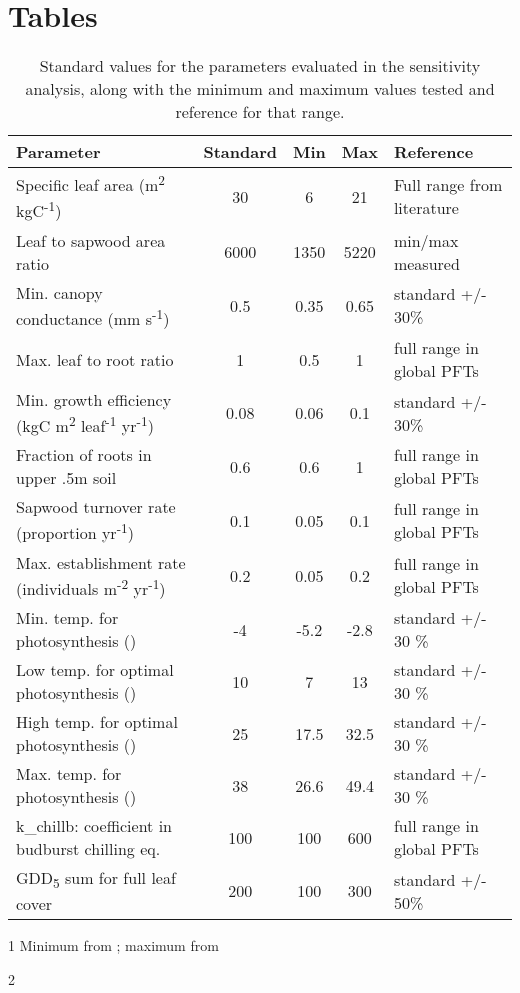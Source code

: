 \documentclass[]{article}
\title{}
\author{}
\begin{document}
	
\section{Tables}

\begin{table}[ht]
	\begin{threeparttable}
	\caption{Standard values for the parameters evaluated in the sensitivity analysis, along with the minimum and maximum values tested and reference for that range.} 
	\begin{tabular}{lcccl}
		\toprule
		Parameter & Standard & Min & Max & Reference \\ 
		\midrule
		Specific leaf area (m\textsuperscript{2} kgC\textsuperscript{-1}) & 30 & 6 & 21 & Full range from literature\tnote1 \\
		Leaf to sapwood area ratio & 6000 & 1350 & 5220 & min/max measured\tnote2 \\
		Min. canopy conductance (mm s\textsuperscript{-1}) & 0.5 & 0.35 & 0.65 & standard +/- 30\% \\
		Max. leaf to root ratio & 1 & 0.5 & 1 & full range in global PFTs \\
		Min. growth efficiency (kgC m\textsuperscript{2} leaf\textsuperscript{-1} yr\textsuperscript{-1}) & 0.08 & 0.06 & 0.1 & standard +/- 30\% \\
		Fraction of roots in upper .5m soil & 0.6 & 0.6 & 1 & full range in global PFTs \\
		Sapwood turnover rate (proportion yr\textsuperscript{-1}) & 0.1 & 0.05 & 0.1 & full range in global PFTs \\
		Max. establishment rate (individuals m\textsuperscript{-2} yr\textsuperscript{-1}) & 0.2 & 0.05 & 0.2 & full range in global PFTs \\
		Min. temp. for photosynthesis (\celsius) & -4 & -5.2 & -2.8 & standard +/- 30 \% \\
		Low temp. for optimal photosynthesis (\celsius) & 10 & 7 & 13 & standard +/- 30 \% \\
		High temp. for optimal photosynthesis (\celsius) & 25 & 17.5 & 32.5 & standard +/- 30 \% \\
		Max. temp. for photosynthesis (\celsius) & 38 & 26.6 & 49.4 & standard +/- 30 \% \\
		k\_chillb: coefficient in budburst chilling eq. & 100 & 100 & 600 & full range in global PFTs \\
		GDD\textsubscript{5} sum for full leaf cover & 200 & 100 & 300 & standard +/- 50\% \\
	\bottomrule
	\end{tabular}
\begin{tablenotes}
	\item[1] Minimum from \citet{Olsoy2016}; maximum from \citet{Ganskopp1986}
	\item[2] \citet{Ganskopp1986}
\end{tablenotes}
\end{threeparttable}
\end{table}
\end{document}
